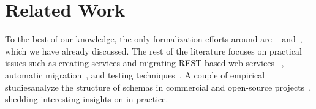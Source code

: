 \section{Related Work}\label{sec:related}

To the best of our knowledge, the only formalization efforts around \gql are \HP~\cite{gqlph} and~\cite{olafschema}, which we have already discussed. The rest of the \gql literature focuses on practical issues such as creating \gql services and migrating REST-based web services \gql~\cite{improvingoeeu, ehriapi, gqlexperiences}, automatic migration~\cite{migratingapi}, and testing techniques~\cite{gqldeviation}. A couple of empirical studiesanalyze the structure of \gql schemas in commercial and open-source projects~\cite{empiricalgql, empiricalapi}, shedding interesting insights on \gql in practice.

